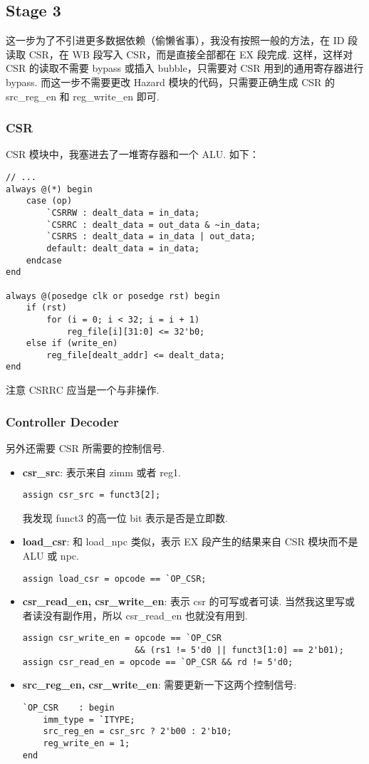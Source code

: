 \documentclass{article}
\begin{document}
\subsection{Stage 3}
这一步为了不引进更多数据依赖（偷懒省事），我没有按照一般的方法，在 ID 段读取 CSR，在 WB 段写入 CSR，而是直接全部都在 EX 段完成. 这样，这样对 CSR 的读取不需要 bypass 或插入 bubble，只需要对 CSR 用到的通用寄存器进行 bypass. 而这一步不需要更改 Hazard 模块的代码，只需要正确生成 CSR 的 src\_reg\_en 和 reg\_write\_en 即可.

\subsubsection{CSR}
CSR 模块中，我塞进去了一堆寄存器和一个 ALU. 如下：
\begin{verbatim}
// ...
always @(*) begin
    case (op)
        `CSRRW : dealt_data = in_data;
        `CSRRC : dealt_data = out_data & ~in_data;
        `CSRRS : dealt_data = in_data | out_data;
        default: dealt_data = in_data;
    endcase
end

always @(posedge clk or posedge rst) begin
    if (rst)
        for (i = 0; i < 32; i = i + 1)
            reg_file[i][31:0] <= 32'b0;
    else if (write_en)
        reg_file[dealt_addr] <= dealt_data;
end
\end{verbatim}
注意 CSRRC 应当是一个与非操作.
\subsubsection{Controller Decoder}
另外还需要 CSR 所需要的控制信号.
\begin{itemize}
  \item
    \textbf{csr\_src}: 表示来自 zimm 或者 reg1.
    \begin{verbatim}
assign csr_src = funct3[2];
    \end{verbatim}
    我发现 funct3 的高一位 bit 表示是否是立即数.
  \item
    \textbf{load\_csr}: 和 load\_npc 类似，表示 EX 段产生的结果来自 CSR 模块而不是 ALU 或 npc.
    \begin{verbatim}
assign load_csr = opcode == `OP_CSR;
    \end{verbatim}
  \item
    \textbf{csr\_read\_en, csr\_write\_en}: 表示 csr 的可写或者可读. 当然我这里写或者读没有副作用，所以 csr\_read\_en 也就没有用到.
    \begin{verbatim}
assign csr_write_en = opcode == `OP_CSR
                      && (rs1 != 5'd0 || funct3[1:0] == 2'b01);
assign csr_read_en = opcode == `OP_CSR && rd != 5'd0;
    \end{verbatim}
  \item
    \textbf{src\_reg\_en, csr\_write\_en}: 需要更新一下这两个控制信号:
    \begin{verbatim}
`OP_CSR    : begin
    imm_type = `ITYPE;
    src_reg_en = csr_src ? 2'b00 : 2'b10;
    reg_write_en = 1;
end
    \end{verbatim}
\end{itemize}
\end{document}
